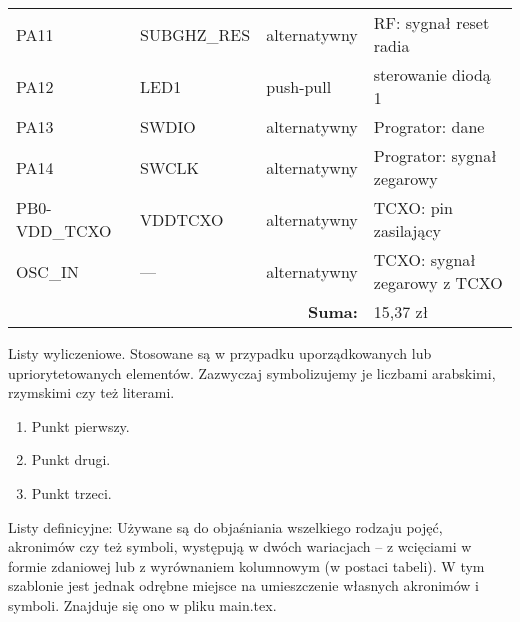 \begin{table}[H]
\begin{tabular}{l l l l}
        PA11                     & SUBGHZ\_RES             & alternatywny           & RF: sygnał reset radia                     \\ 
        PA12                     & LED1                    & push-pull              & sterowanie diodą 1                         \\ 
        PA13                     & SWDIO                   & alternatywny           & Progrator: dane                            \\ 
        PA14                     & SWCLK                   & alternatywny           & Progrator: sygnał zegarowy                 \\ 
        PB0-VDD\_TCXO            & VDDTCXO                 & alternatywny           & TCXO: pin zasilający                       \\ 
        OSC\_IN                  & ---                     & alternatywny           & TCXO: sygnał zegarowy z TCXO               \\ 
        \midrule \multicolumn{3}{r}{\textbf{Suma:}} & 15,37 zł \\
        \bottomrule[2pt]
    \end{tabular}
\end{table}

\noindent Listy wyliczeniowe. Stosowane są w przypadku uporządkowanych lub upriorytetowanych elementów. Zazwyczaj symbolizujemy je liczbami arabskimi, rzymskimi czy też literami.
\begin{enumerate}
    \item Punkt pierwszy.
    \item Punkt drugi.
    \item Punkt trzeci.
\end{enumerate}
\noindent Listy definicyjne:
Używane są do objaśniania wszelkiego rodzaju pojęć,  akronimów czy też symboli, występują w dwóch
wariacjach -- z wcięciami w formie zdaniowej lub z wyrównaniem kolumnowym (w postaci tabeli).
W tym szablonie jest jednak odrębne miejsce na umieszczenie własnych akronimów i symboli. Znajduje
się ono w pliku main.tex.

